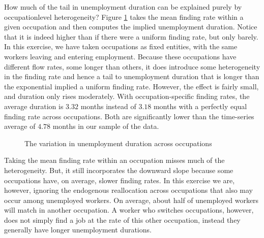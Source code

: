 \documentclass[12pt]{article}
\theoremstyle{definition}
\begin{document}
How much of the tail in unemployment duration can be explained purely by occupationlevel heterogeneity? Figure \ref{wiczerLongTermUnemploymentAttached2015_fig6} takes the mean finding rate within a given occupation and then computes the implied unemployment duration. Notice that it is indeed higher than if there were a uniform finding rate, but only barely. In this exercise, we have taken occupations as fixed entities, with the same workers leaving and entering employment. Because these occupations have different flow rates, some longer than others, it does introduce some heterogeneity in the finding rate and hence a tail to unemployment duration that is longer than the exponential implied a uniform finding rate. However, the effect is fairly small, and duration only rises moderately. With occupation-specific finding rates, the average duration is $3.32$ months instead of $3.18$ months with a perfectly equal finding rate across occupations. Both are significantly lower than the time-series average of $4.78$ months in our sample of the data.

\begin{figure}[H]
    \noindent\caption{The variation in unemployment duration across occupations}
    \begin{center}
        \label{wiczerLongTermUnemploymentAttached2015_fig6}
    \end{center}
\end{figure}

Taking the mean finding rate within an occupation misses much of the heterogeneity. But, it still incorporates the downward slope because some occupations have, on average, slower finding rates. In this exercise we are, however, ignoring the endogenous reallocation across occupations that also may occur among unemployed workers. On average, about half of unemployed workers will match in another occupation. A worker who switches occupations, however, does not simply find a job at the rate of this other occupation, instead they generally have longer unemployment durations.
\end{document}
